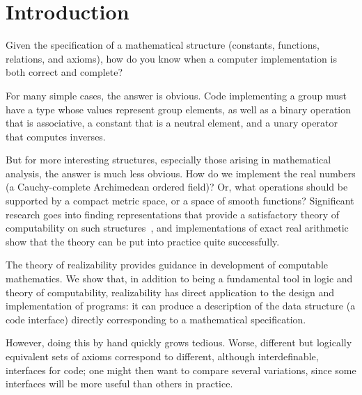 \section{Introduction}
\label{sec:introduction}


Given the specification of a mathematical structure (constants,
functions, relations, and axioms), how do you know when a computer
implementation is both correct and complete?

For many simple cases, the answer is obvious. Code implementing a
group must have a type whose values represent group elements, as well
as a binary operation that is associative, a constant that is a
neutral element, and a unary operator that computes inverses.

But for more interesting structures, especially those arising in
mathematical analysis, the answer is much less obvious. How do we
implement the real numbers (a Cauchy-complete Archimedean ordered
field)? Or, what operations should be supported by a compact metric
space, or a space of smooth functions? Significant research goes into
finding representations that provide a satisfactory theory of
computability on such structures~\cite{Wei00,TZ98,Bla97,EL00}, and
implementations of exact real arithmetic~\cite{Mue00,Lam05a} show that
the theory can be put into practice quite successfully.

The theory of realizability provides guidance in development of
computable mathematics. We show that, in addition to being a
fundamental tool in logic and theory of computability, realizability
has direct application to the design and implementation of programs:
it can produce a description of the data structure (a code interface)
directly corresponding to a mathematical specification.

However, doing this by hand quickly grows tedious. Worse, different
but logically equivalent sets of axioms correspond to different,
although interdefinable, interfaces for code; one might then want to
compare several variations, since some interfaces will be more useful
than others in practice.


